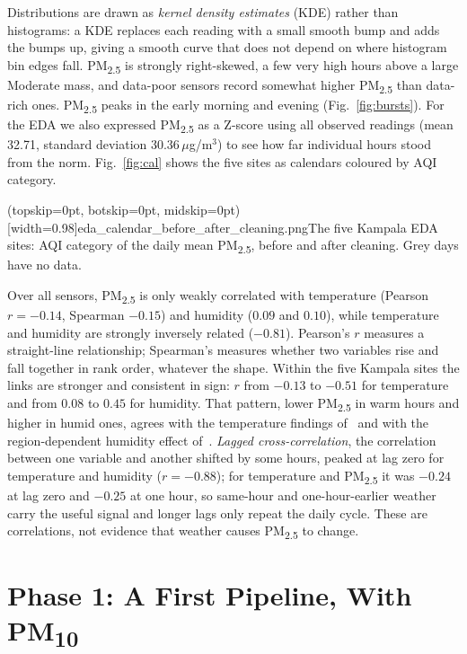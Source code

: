 \documentclass{ieeeaccess}
\newcommand{\ugm}{\,$\mu$g/m$^{3}$}
\newcommand{\pmtwo}{PM\textsubscript{2.5}}
\newcommand{\pmten}{PM\textsubscript{10}}
\begin{document}
Distributions are drawn as \emph{kernel density estimates} (KDE) rather than histograms: a KDE replaces each reading with a small smooth bump and adds the bumps up, giving a smooth curve that does not depend on where histogram bin edges fall. \pmtwo{} is strongly right-skewed, a few very high hours above a large Moderate mass, and data-poor sensors record somewhat higher \pmtwo{} than data-rich ones. \pmtwo{} peaks in the early morning and evening (Fig.~\ref{fig:bursts}). For the EDA we also expressed \pmtwo{} as a Z-score using all observed readings (mean 32.71, standard deviation 30.36\ugm) to see how far individual hours stood from the norm. Fig.~\ref{fig:cal} shows the five sites as calendars coloured by AQI category.

\Figure[t!](topskip=0pt, botskip=0pt, midskip=0pt)[width=0.98\columnwidth]{eda_calendar_before_after_cleaning.png}{The five Kampala EDA sites: AQI category of the daily mean \pmtwo{}, before and after cleaning. Grey days have no data.\label{fig:cal}}

Over all sensors, \pmtwo{} is only weakly correlated with temperature (Pearson $r = -0.14$, Spearman $-0.15$) and humidity ($0.09$ and $0.10$), while temperature and humidity are strongly inversely related ($-0.81$). Pearson's $r$ measures a straight-line relationship; Spearman's measures whether two variables rise and fall together in rank order, whatever the shape. Within the five Kampala sites the links are stronger and consistent in sign: $r$ from $-0.13$ to $-0.51$ for temperature and from $0.08$ to $0.45$ for humidity. That pattern, lower \pmtwo{} in warm hours and higher in humid ones, agrees with the temperature findings of~\cite{wangogawa2015} and with the region-dependent humidity effect of~\cite{yang2017}. \emph{Lagged cross-correlation}, the correlation between one variable and another shifted by some hours, peaked at lag zero for temperature and humidity ($r = -0.88$); for temperature and \pmtwo{} it was $-0.24$ at lag zero and $-0.25$ at one hour, so same-hour and one-hour-earlier weather carry the useful signal and longer lags only repeat the daily cycle. These are correlations, not evidence that weather causes \pmtwo{} to change.

\section{Phase 1: A First Pipeline, With \pmten{}}
\label{sec:phase1}
\end{document}
